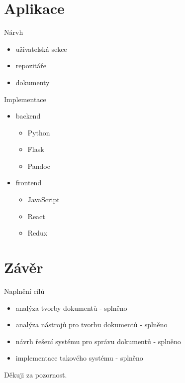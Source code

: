 \documentclass[czech,aspectratio=169]{beamer}
\begin{document}
\section{Aplikace}
    \begin{frame}
        \tableofcontents[currentsection]
    \end{frame}
    \begin{frame}{Nárvh}
        \begin{itemize}
            \item uživatelská sekce \pause{}
            \item repozitáře \pause{}
            \item dokumenty
        \end{itemize}
    \end{frame}
    \begin{frame}{Implementace}
        \begin{itemize}
            \item backend \pause{}
            \begin{itemize}
                \item Python
                \item Flask
                \item Pandoc
            \end{itemize}
            \item frontend \pause{}
            \begin{itemize}
                \item JavaScript
                \item React
                \item Redux
            \end{itemize}
        \end{itemize}
    \end{frame}

\section{Závěr}
    \begin{frame}
        \tableofcontents[currentsection]
    \end{frame}
    \begin{frame}{Naplnění cílů}
        \begin{itemize}
            \item analýza tvorby dokumentů \pause{} - splněno
            \item analýza nástrojů pro tvorbu dokumentů \pause{} - splněno
            \item návrh řešení systému pro správu dokumentů \pause{} - splněno
            \item implementace takového systému \pause{} - splněno
        \end{itemize}
        \vfill{Děkuji za pozornost.}
    \end{frame}
\end{document}
